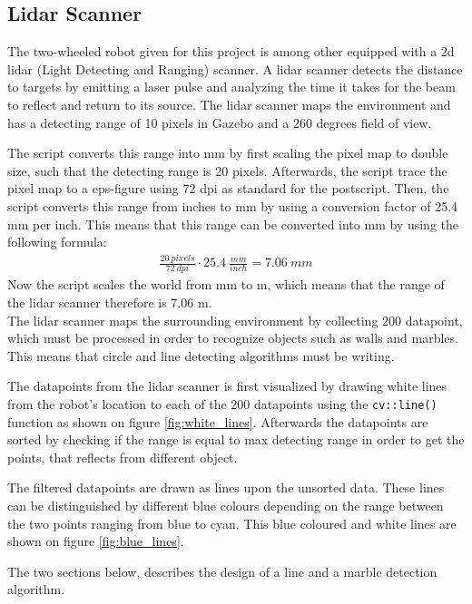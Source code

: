 \documentclass[../Head/Main.tex]{subfiles}
\begin{document}
\subsection{Lidar Scanner}
The two-wheeled robot given for this project is among other equipped with a 2d lidar (Light Detecting and Ranging) scanner. A lidar scanner detects the distance to targets by emitting a laser pulse and analyzing the time it takes for the beam to reflect and return to its source. The lidar scanner maps the environment and has a detecting range of 10 pixels in Gazebo and a 260 degrees field of view. \par
The script converts this range into mm by first scaling the pixel map to double size, such that the detecting range is 20 pixels. Afterwards, the script trace the pixel map to a eps-figure using 72 dpi as standard 
for the postscript. Then, the script converts this range from inches to mm by using a conversion factor of 25.4 mm per inch. This means that this range can be converted into mm by using the following formula:
\begin{align*}
\frac{20~pixels}{72~dpi}\cdot 25.4~\frac{mm}{inch} = 7.06~mm
\end{align*}
Now the script scales the world from mm to m, which means that the range of the lidar scanner therefore is 7.06 m.\\
The lidar scanner maps the surrounding environment by collecting 200 datapoint, which must be processed in order to recognize objects such as walls and marbles. This means that circle and line detecting algorithms must be writing. \par
The datapoints from the lidar scanner is first visualized by drawing white lines from the robot’s location to each of the 200 datapoints using the \texttt{cv::line()} function as shown on figure \ref{fig:white_lines}. Afterwards the datapoints are sorted by checking if the range is equal to max detecting range in order to get the points, that reflects from different object.\par
The filtered datapoints are drawn as lines upon the unsorted data. These lines can be distinguished by different blue colours depending on the range between the two points ranging from blue to cyan. This blue coloured and white lines are shown on figure \ref{fig:blue_lines}.

The two sections below, describes the design of a line and a marble detection algorithm.


\end{document}
